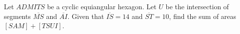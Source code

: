 Let $ADMITS$ be a cyclic equiangular hexagon. Let $U$ be the intersection of segments $\overline{MS}$ and $\overline{AI}$. Given that $\overline{IS}=14$ and $\overline{ST}=10$, find the sum of areas $[SAM]+[TSUI]$.
